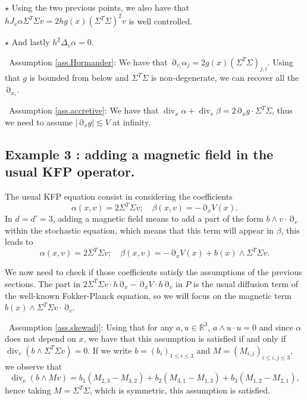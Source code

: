 \documentclass[12pt]{amsart}
\newcommand{\R}{\mathbb R}
\renewcommand{\div}{\operatorname{div}}
\numberwithin{equation}{section}
\numberwithin{figure}{section}
\DeclareMathOperator{\p}{\partial}
\begin{document}
\quad $\star$ Using the two previous points, we also have that $hJ_v\alpha\Sigma^T\Sigma v = 2hg(x)(\Sigma^T\Sigma)^2v$ is well controlled.

\quad $\star$ And lastly $h^2\Delta_v\alpha = 0$.

\textbullet\ Assumption \ref{ass.Hormander}: We have that $\p_{v_i}\alpha_j = 2g(x)(\Sigma^T\Sigma)_{j,i}$. Using that $g$ is bounded from below and $\Sigma^T\Sigma$ is non-degenerate, we can recover all the $\p_{x_i}$.

\textbullet\ Assumption \ref{ass.accretive}: We have that $\div_x\alpha + \div_v\beta = 2\p_xg\cdot\Sigma^T\Sigma$, thus we need to assume $|\p_xg|\lesssim V$ at infinity.










\subsection{Example 3 : adding a magnetic field in the usual KFP operator.}\label{ssec:exampleMagnetic}
The usual KFP equation consist in considering the coefficients
\begin{equation*}
\alpha(x,v) = 2\Sigma^T\Sigma v;\quad \beta(x,v) = - \p_xV(x).
\end{equation*}
In $d = d' = 3$, adding a magnetic field means to add a part of the form $b\wedge v\cdot\p_v$ within the stochastic equation, which means that this term will appear in $\beta$, this leads to
\begin{equation*}
\alpha(x,v) = 2\Sigma^T\Sigma v;\quad \beta(x,v) = - \p_xV(x) + b(x)\wedge\Sigma^T\Sigma v.
\end{equation*}

We now need to check if those coefficients satisfy the assumptions of the previous sections. The part in $2\Sigma^T\Sigma v\cdot h\p_x - \p_xV\cdot h\p_v$ in $P$ is the usual diffusion term of the well-known Fokker-Planck equation, so we will focus on the magnetic term $b(x)\wedge\Sigma^T\Sigma v\cdot \p_v$.

\textbullet\ Assumption \ref{ass.skewadj}: Using that for any $a,u\in\R^3$, $a\wedge u\cdot u = 0$ and since $\alpha$ does not depend on $x$, we have that this assumption is satisfied if and only if $\div_v(b\wedge\Sigma^T\Sigma v) = 0$. If we write $b = (b_i)_{1\leq i\leq3}$ and $M = (M_{i,j})_{i\leq i,j\leq3}$, we observe that
\begin{equation*}
\div_v(b\wedge Mv) = b_1(M_{2,3} - M_{3,2}) + b_2(M_{3,1} - M_{1,3}) + b_3(M_{1,2} - M_{2,1}),
\end{equation*}
hence taking $M = \Sigma^T\Sigma$, which is symmetric, this assumption is satisfied.
\end{document}
